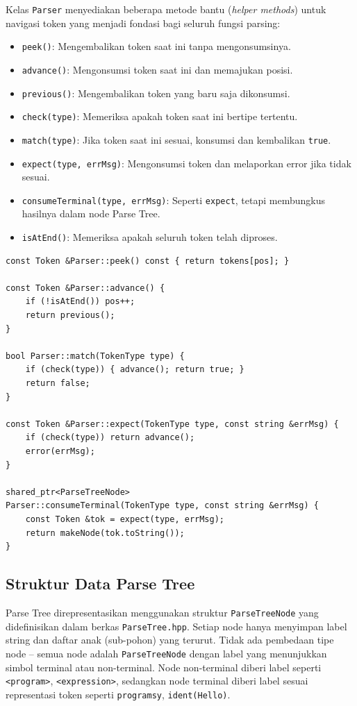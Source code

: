 ﻿\documentclass[12pt,a4paper]{article}
\begin{document}
Kelas \texttt{Parser} menyediakan beberapa metode bantu (\textit{helper methods}) untuk navigasi token yang menjadi fondasi bagi seluruh fungsi parsing:

\begin{itemize}
    \item \texttt{peek()}: Mengembalikan token saat ini tanpa mengonsumsinya.
    \item \texttt{advance()}: Mengonsumsi token saat ini dan memajukan posisi.
    \item \texttt{previous()}: Mengembalikan token yang baru saja dikonsumsi.
    \item \texttt{check(type)}: Memeriksa apakah token saat ini bertipe tertentu.
    \item \texttt{match(type)}: Jika token saat ini sesuai, konsumsi dan kembalikan \texttt{true}.
    \item \texttt{expect(type, errMsg)}: Mengonsumsi token dan melaporkan error jika tidak sesuai.
    \item \texttt{consumeTerminal(type, errMsg)}: Seperti \texttt{expect}, tetapi membungkus hasilnya dalam node Parse Tree.
    \item \texttt{isAtEnd()}: Memeriksa apakah seluruh token telah diproses.
\end{itemize}

\begin{lstlisting}[style=cpp, caption={Implementasi metode bantu parser}]
const Token &Parser::peek() const { return tokens[pos]; }

const Token &Parser::advance() {
    if (!isAtEnd()) pos++;
    return previous();
}

bool Parser::match(TokenType type) {
    if (check(type)) { advance(); return true; }
    return false;
}

const Token &Parser::expect(TokenType type, const string &errMsg) {
    if (check(type)) return advance();
    error(errMsg);
}

shared_ptr<ParseTreeNode>
Parser::consumeTerminal(TokenType type, const string &errMsg) {
    const Token &tok = expect(type, errMsg);
    return makeNode(tok.toString());
}
\end{lstlisting}

\subsection{Struktur Data Parse Tree}

Parse Tree direpresentasikan menggunakan struktur \texttt{ParseTreeNode} yang didefinisikan dalam berkas \texttt{ParseTree.hpp}. Setiap node hanya menyimpan label string dan daftar anak (sub-pohon) yang terurut. Tidak ada pembedaan tipe node -- semua node adalah \texttt{ParseTreeNode} dengan label yang menunjukkan simbol terminal atau non-terminal. Node non-terminal diberi label seperti \texttt{<program>}, \texttt{<expression>}, sedangkan node terminal diberi label sesuai representasi token seperti \texttt{programsy}, \texttt{ident(Hello)}.
\end{document}

